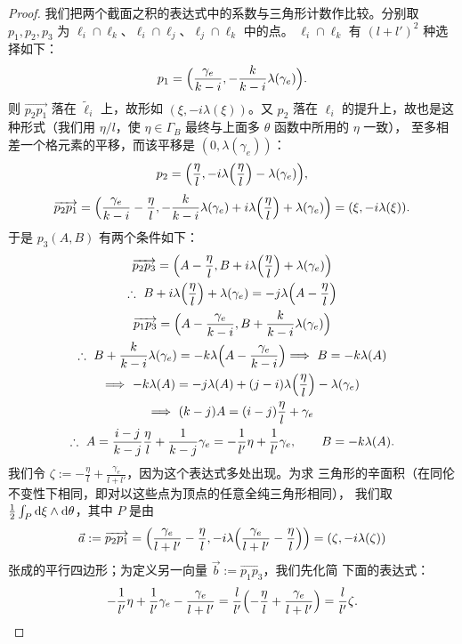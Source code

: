 \begin{proof}
我们把两个截面之积的表达式中的系数与三角形计数作比较。分别取 $p_1,p_2,p_3$ 为
$\ell_i\cap\ell_k$、$\ell_i\cap\ell_j$、$\ell_j\cap\ell_k$ 中的点。
$\ell_i\cap\ell_k$ 有 $(l+l')^2$ 种选择如下：
\[
p_1=\Bigl(\frac{\gamma_e}{k-i},-\frac{k}{k-i}\lambda(\gamma_e)\Bigr).
\]
则 $\overrightarrow{p_2p_1}$ 落在 $\tilde\ell_i$ 上，故形如
$(\xi,-i\lambda(\xi))$。又 $p_2$ 落在 $\ell_i$ 的提升上，故也是这种形式（我们用
$\eta/l$，使 $\eta\in\Gamma_B$ 最终与上面多 $\theta$ 函数中所用的 $\eta$ 一致），
至多相差一个格元素的平移，而该平移是 $(0,\lambda(\gamma_e))$：
\[
p_2=\Bigl(\frac\eta l,-i\lambda\Bigl(\frac\eta l\Bigr)-\lambda(\gamma_e)\Bigr),
\]
\[
\overrightarrow{p_2p_1}=\Bigl(\frac{\gamma_e}{k-i}-\frac\eta l,
-\frac{k}{k-i}\lambda(\gamma_e)+i\lambda\Bigl(\frac\eta l\Bigr)+\lambda(\gamma_e)\Bigr)
=(\xi,-i\lambda(\xi)).
\]
于是 $p_3(A,B)$ 有两个条件如下：
\begin{gather*}
\overrightarrow{p_2p_3}=\Bigl(A-\frac\eta l,
B+i\lambda\Bigl(\frac\eta l\Bigr)+\lambda(\gamma_e)\Bigr)\\
\therefore\ B+i\lambda\Bigl(\frac\eta l\Bigr)+\lambda(\gamma_e)
=-j\lambda\Bigl(A-\frac\eta l\Bigr)\\
\overrightarrow{p_1p_3}=\Bigl(A-\frac{\gamma_e}{k-i},
B+\frac{k}{k-i}\lambda(\gamma_e)\Bigr)\\
\therefore\ B+\frac{k}{k-i}\lambda(\gamma_e)
=-k\lambda\Bigl(A-\frac{\gamma_e}{k-i}\Bigr)
\Longrightarrow\ B=-k\lambda(A)\\
\Longrightarrow\ -k\lambda(A)=-j\lambda(A)+(j-i)\lambda\Bigl(\frac\eta l\Bigr)
-\lambda(\gamma_e)\\
\Longrightarrow\ (k-j)A=(i-j)\frac\eta l+\gamma_e\\
\therefore\ A=\frac{i-j}{k-j}\frac\eta l+\frac{1}{k-j}\gamma_e
=-\frac1{l'}\eta+\frac1{l'}\gamma_e,\qquad B=-k\lambda(A).
\end{gather*}
我们令 $\zeta:=-\frac\eta l+\frac{\gamma_e}{l+l'}$，因为这个表达式多处出现。为求
三角形的辛面积（在同伦不变性下相同，即对以这些点为顶点的任意全纯三角形相同），
我们取 $\frac12\int_P\mathrm{d}\xi\wedge\mathrm{d}\theta$，其中 $P$ 是由
\[
\vec a:=\overrightarrow{p_2p_1}
=\Bigl(\frac{\gamma_e}{l+l'}-\frac\eta l,
-i\lambda\Bigl(\frac{\gamma_e}{l+l'}-\frac\eta l\Bigr)\Bigr)
=(\zeta,-i\lambda(\zeta))
\]
张成的平行四边形；为定义另一向量 $\vec b:=\overrightarrow{p_1p_3}$，我们先化简
下面的表达式：
\[
-\frac1{l'}\eta+\frac1{l'}\gamma_e-\frac{\gamma_e}{l+l'}
=\frac{l}{l'}\Bigl(-\frac\eta l+\frac{\gamma_e}{l+l'}\Bigr)=\frac{l}{l'}\zeta.
\]


\end{proof}
